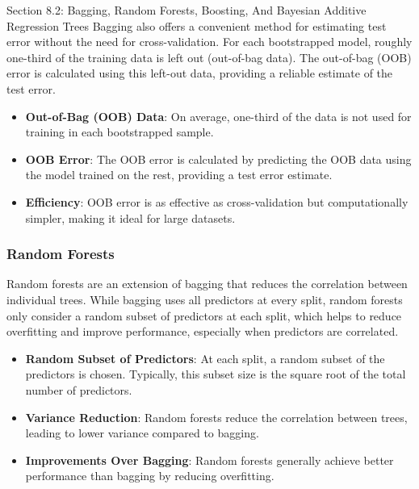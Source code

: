 \begin{notes}{Section 8.2: Bagging, Random Forests, Boosting, And Bayesian Additive Regression Trees}
    Bagging also offers a convenient method for estimating test error without the need for cross-validation. For each bootstrapped model, roughly one-third of the training data is left out (out-of-bag data). 
    The out-of-bag (OOB) error is calculated using this left-out data, providing a reliable estimate of the test error.
    
    \begin{highlight}
        \begin{itemize}
            \item \textbf{Out-of-Bag (OOB) Data}: On average, one-third of the data is not used for training in each bootstrapped sample.
            \item \textbf{OOB Error}: The OOB error is calculated by predicting the OOB data using the model trained on the rest, providing a test error estimate.
            \item \textbf{Efficiency}: OOB error is as effective as cross-validation but computationally simpler, making it ideal for large datasets.
        \end{itemize}
    \end{highlight}
    
    \subsubsection*{Random Forests}
    
    Random forests are an extension of bagging that reduces the correlation between individual trees. While bagging uses all predictors at every split, random forests only consider a random subset of 
    predictors at each split, which helps to reduce overfitting and improve performance, especially when predictors are correlated.
    
    \begin{highlight}
        \begin{itemize}
            \item \textbf{Random Subset of Predictors}: At each split, a random subset of the predictors is chosen. Typically, this subset size is the square root of the total number of predictors.
            \item \textbf{Variance Reduction}: Random forests reduce the correlation between trees, leading to lower variance compared to bagging.
            \item \textbf{Improvements Over Bagging}: Random forests generally achieve better performance than bagging by reducing overfitting.
        \end{itemize}
    \end{highlight}
    

\end{notes}
